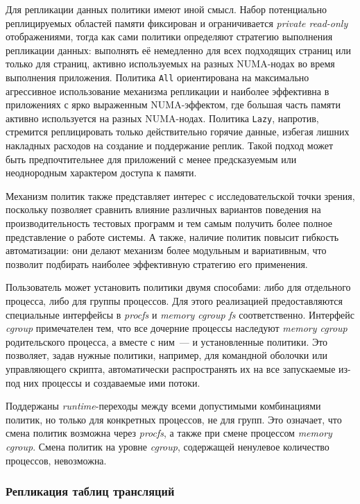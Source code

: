 Для репликации данных политики имеют иной смысл. Набор потенциально реплицируемых областей памяти фиксирован и ограничивается \textit{private read-only} отображениями, тогда как сами политики определяют стратегию выполнения репликации данных: выполнять её немедленно для всех подходящих страниц или только для страниц, активно используемых на разных NUMA-нодах во время выполнения приложения. Политика \texttt{All} ориентирована на максимально агрессивное использование механизма репликации и наиболее эффективна в приложениях с ярко выраженным NUMA-эффектом, где большая часть памяти активно используется на разных NUMA-нодах. Политика \texttt{Lazy}, напротив, стремится реплицировать только действительно горячие данные, избегая лишних накладных расходов на создание и поддержание реплик. Такой подход может быть предпочтительнее для приложений с менее предсказуемым или неоднородным характером доступа к памяти.

Механизм политик также представляет интерес с исследовательской точки зрения, поскольку позволяет сравнить влияние различных вариантов поведения на производительность тестовых программ и тем самым получить более полное представление о работе системы. А также, наличие политик повысит гибкость автоматизации: они делают механизм более модульным и вариативным, что позволит подбирать наиболее эффективную стратегию его применения.

Пользователь может установить политики двумя способами: либо для отдельного процесса, либо для группы процессов. Для этого реализацией предоставляются специальные интерфейсы в \textit{procfs}\cite{procfs} и \textit{memory cgroup fs}\cite{cgroup} соответственно. Интерфейс \textit{cgroup} примечателен тем, что все дочерние процессы наследуют \textit{memory cgroup} родительского процесса, а вместе с ним~--- и установленные политики. Это позволяет, задав нужные политики, например, для командной оболочки или управляющего скрипта, автоматически распространять их на все запускаемые из-под них процессы и создаваемые ими потоки.

Поддержаны \textit{runtime}-переходы между всеми допустимыми комбинациями политик, но только для конкретных процессов, не для групп. Это означает, что смена политик возможна через \textit{procfs}, а также при смене процессом \textit{memory cgroup}. Смена политик на уровне \textit{cgroup}, содержащей ненулевое количество процессов, невозможна.

\subsubsection{Репликация таблиц трансляций}

